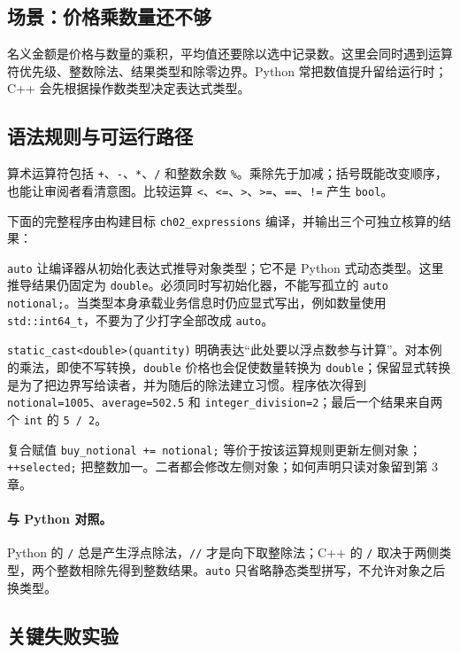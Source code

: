 \subsection{场景：价格乘数量还不够}

名义金额是价格与数量的乘积，平均值还要除以选中记录数。这里会同时遇到运算符优先级、整数除法、结果类型和除零边界。Python 常把数值提升留给运行时；C++ 会先根据操作数类型决定表达式类型。

\subsection{语法规则与可运行路径}

算术运算符包括 \texttt{+}、\texttt{-}、\texttt{*}、\texttt{/} 和整数余数 \texttt{\%}。乘除先于加减；括号既能改变顺序，也能让审阅者看清意图。比较运算 \texttt{<}、\texttt{<=}、\texttt{>}、\texttt{>=}、\texttt{==}、\texttt{!=} 产生 \texttt{bool}。

下面的完整程序由构建目标 \texttt{ch02\_expressions} 编译，并输出三个可独立核算的结果：



\texttt{auto} 让编译器从初始化表达式推导对象类型；它不是 Python 式动态类型。这里推导结果仍固定为 \texttt{double}。必须同时写初始化器，不能写孤立的 \texttt{auto notional;}。当类型本身承载业务信息时仍应显式写出，例如数量使用 \texttt{std::int64\_t}，不要为了少打字全部改成 \texttt{auto}。

\texttt{static\_cast<double>(quantity)} 明确表达“此处要以浮点数参与计算”。对本例的乘法，即使不写转换，\texttt{double} 价格也会促使数量转换为 \texttt{double}；保留显式转换是为了把边界写给读者，并为随后的除法建立习惯。程序依次得到 \texttt{notional=1005}、\texttt{average=502.5} 和 \texttt{integer\_division=2}；最后一个结果来自两个 \texttt{int} 的 \texttt{5 / 2}。

复合赋值 \texttt{buy\_notional += notional;} 等价于按该运算规则更新左侧对象；\texttt{++selected;} 把整数加一。二者都会修改左侧对象；如何声明只读对象留到第 3 章。

\paragraph{与 Python 对照。}
Python 的 \texttt{/} 总是产生浮点除法，\texttt{//} 才是向下取整除法；C++ 的 \texttt{/} 取决于两侧类型，两个整数相除先得到整数结果。\texttt{auto} 只省略静态类型拼写，不允许对象之后换类型。

\subsection{关键失败实验}

